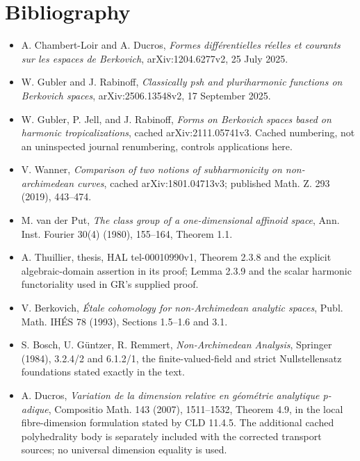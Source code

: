 \documentclass[
  10pt,
]{article}
\providecommand{\tightlist}{%
  \setlength{\itemsep}{0pt}\setlength{\parskip}{0pt}}
\begin{document}
\section{Bibliography}\label{bibliography}

\begin{itemize}
\tightlist
\item
  A. Chambert-Loir and A. Ducros, \emph{Formes différentielles réelles
  et courants sur les espaces de Berkovich}, arXiv:1204.6277v2, 25 July
  2025.
\item
  W. Gubler and J. Rabinoff, \emph{Classically psh and pluriharmonic
  functions on Berkovich spaces}, arXiv:2506.13548v2, 17 September 2025.
\item
  W. Gubler, P. Jell, and J. Rabinoff, \emph{Forms on Berkovich spaces
  based on harmonic tropicalizations}, cached arXiv:2111.05741v3. Cached
  numbering, not an uninspected journal renumbering, controls
  applications here.
\item
  V. Wanner, \emph{Comparison of two notions of subharmonicity on
  non-archimedean curves}, cached arXiv:1801.04713v3; published Math. Z.
  293 (2019), 443--474.
\item
  M. van der Put, \emph{The class group of a one-dimensional affinoid
  space}, Ann. Inst. Fourier 30(4) (1980), 155--164, Theorem 1.1.
\item
  A. Thuillier, thesis, HAL tel-00010990v1, Theorem 2.3.8 and the
  explicit algebraic-domain assertion in its proof; Lemma 2.3.9 and the
  scalar harmonic functoriality used in GR's supplied proof.
\item
  V. Berkovich, \emph{Étale cohomology for non-Archimedean analytic
  spaces}, Publ. Math. IHÉS 78 (1993), Sections 1.5--1.6 and 3.1.
\item
  S. Bosch, U. Güntzer, R. Remmert, \emph{Non-Archimedean Analysis},
  Springer (1984), 3.2.4/2 and 6.1.2/1, the finite-valued-field and
  strict Nullstellensatz foundations stated exactly in the text.
\item
  A. Ducros, \emph{Variation de la dimension relative en géométrie
  analytique p-adique}, Compositio Math. 143 (2007), 1511--1532, Theorem
  4.9, in the local fibre-dimension formulation stated by CLD 11.4.5.
  The additional cached polyhedrality body is separately included with
  the corrected transport sources; no universal dimension equality is
  used.
\end{itemize}
\end{document}

